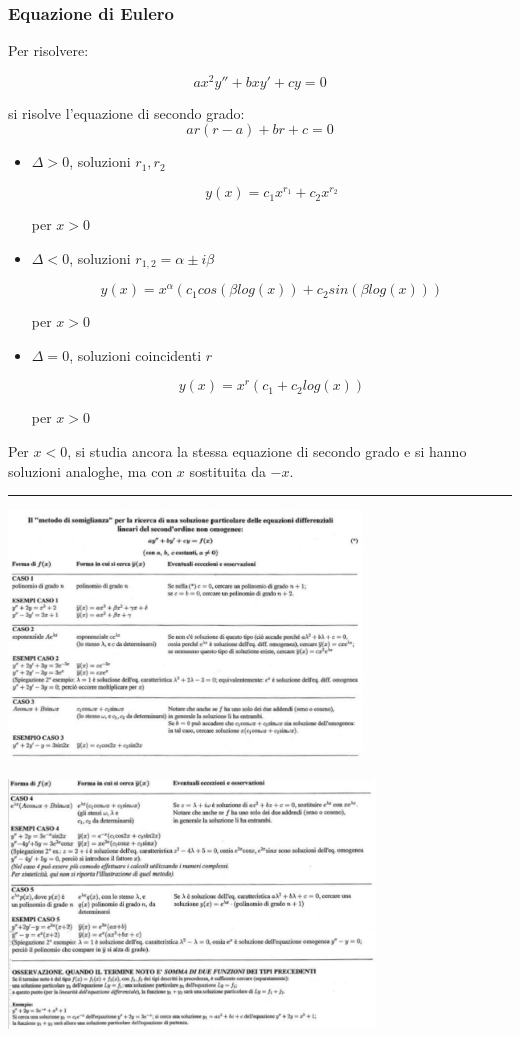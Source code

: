 \subsubsection*{Equazione di Eulero}
Per risolvere:
\begin{tcolorbox}
\[
    ax^2y''+bxy'+cy= 0
\]
\end{tcolorbox}
si risolve l'equazione di secondo grado:
\[
    ar(r-a)+br+c = 0
\]
\begin{itemize}
    \item $\Delta >0$, soluzioni $r_1, r_2$
    \begin{tcolorbox}
    \[
        y(x) =c_1x^{r_1}+c_2x^{r_2}
    \]
    \end{tcolorbox}
    per $x>0$
    \item $\Delta <0$, soluzioni $r_{1,2} = \alpha \pm i \beta$
    \begin{tcolorbox}
    \[
        y(x) = x^{\alpha}(c_1 cos(\beta log(x)) + c_2 sin(\beta log(x)))
    \]
    \end{tcolorbox}
    per $x>0$
    \item $\Delta = 0$, soluzioni coincidenti $r$
    \begin{tcolorbox}
    \[
        y(x) = x^r(c_1 + c_2log(x))
    \]
    \end{tcolorbox}
    per $x>0$
\end{itemize}
Per $x<0$, si studia ancora la stessa equazione di secondo grado e si hanno soluzioni analoghe, ma con $x$ sostituita da $-x$.\newline
\rule{\textwidth}{0,4pt}\newline
\begin{tcolorbox}
\begin{center}
    \includegraphics[height=250px]{../img/eqdiff2.PNG}
\end{center}
\begin{center}
    \includegraphics[height=250px]{../img/eqdiff2(1).PNG}
\end{center}
\end{tcolorbox}
